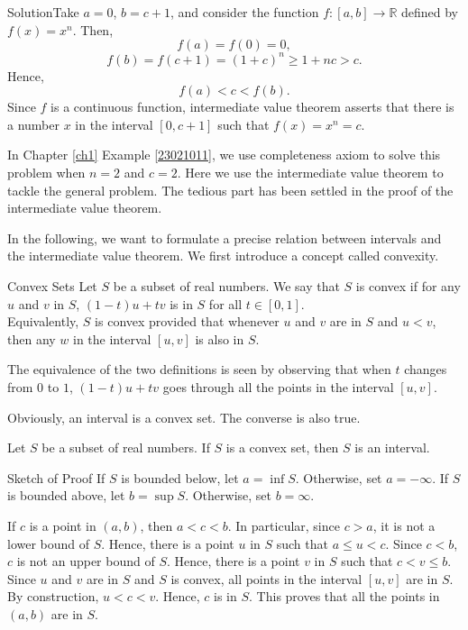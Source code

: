 \begin{example}
\begin{solution}{Solution}Take $a=0$, $b=c+1$, and
consider the function $f:[a, b]\rightarrow\mathbb{R}$ defined by $f(x)=x^n$. Then, \[f(a)=f(0)=0, \]
\[  f(b)=f(c+1)=(1+c)^n\geq 1+nc>c.\]
Hence, \[f(a)<c<f(b).\]
Since $f$ is a continuous function, intermediate value theorem asserts that there is a number $x$ in the interval $[0, c+1]$ such that $f(x)=x^n=c$.
\end{solution}
In Chapter \ref{ch1} Example \ref{23021011}, we use completeness axiom to solve this problem when $n=2$ and $c=2$. Here we use the intermediate value theorem to tackle the general problem. The tedious part has been settled in the proof of the intermediate value theorem.

In the following, we want to formulate a precise relation between intervals and the intermediate value theorem. We first introduce a concept called convexity.

\begin{definition}{Convex Sets}
Let $S$ be a subset of real numbers. We say that $S$ is convex if for any $u$ and $v$ in $S$, $(1-t)u+tv$ is in $S$ for all $t\in [0,1]$. \\Equivalently, $S$ is convex provided that whenever $u$ and $v$ are in $S$ and $u<v$, then any $w$ in the interval $[u,v]$ is also in $S$.
\end{definition}
The equivalence of the two definitions is seen by observing  that when $t$ changes from $0$ to $1$, $(1-t)u+tv$ goes through all the points in the interval $[u, v]$. 

Obviously, an interval is a convex set. The converse is also true.
\begin{theorem}{}
Let $S$ be a subset of real numbers. If $S$ is a convex set, then $S$ is an interval. 
\end{theorem}
\begin{myproof}{Sketch of Proof}
 If $S$ is bounded below, let $a=\inf S$. Otherwise, set $a=-\infty$. If $S$ is bounded above, let $b=\sup S$. Otherwise, set $b=\infty$. 

If $c$ is a point in $(a, b)$, then $a<c<b$. In particular, since $c>a$, it is not a lower bound of $S$. Hence, there is a point $u$ in $S$ such that $a\leq u<c$. Since $c<b$, $c$ is not an upper bound of $S$. Hence, there is a point $v$ in $S$ such that $c<v\leq b$. Since $u$ and $v$ are in $S$ and $S$ is convex, all points in the interval $[u,v]$ are in $S$. By construction, $u<c<v$. Hence, $c$ is in $S$. This proves that all the points in $(a, b)$ are in $S$.


\end{myproof}
\end{example}
